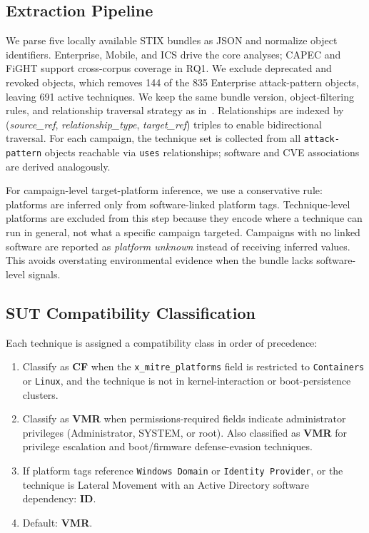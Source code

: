 \documentclass[sigconf,anonymous,review]{acmart}
\newcommand{\stix}{STIX\xspace}
\begin{document}
\subsection{Extraction Pipeline}

We parse five locally available \stix{} bundles as JSON and normalize object identifiers. Enterprise, Mobile, and ICS drive the core analyses; CAPEC and FiGHT support cross-corpus coverage in RQ1. We exclude deprecated and revoked objects, which removes 144 of the 835 Enterprise attack-pattern objects, leaving 691 active techniques. We keep the same bundle version, object-filtering rules, and relationship traversal strategy as in~\cite{ferraz2026proceduralsemanticsgapstructured}. Relationships are indexed by (\textit{source\_ref}, \textit{relationship\_type}, \textit{target\_ref}) triples to enable bidirectional traversal. For each campaign, the technique set is collected from all \texttt{attack-pattern} objects reachable via \texttt{uses} relationships; software and CVE associations are derived analogously.

For campaign-level target-platform inference, we use a conservative rule: platforms are inferred only from software-linked platform tags. Technique-level platforms are excluded from this step because they encode where a technique can run in general, not what a specific campaign targeted. Campaigns with no linked software are reported as \emph{platform unknown} instead of receiving inferred values. This avoids overstating environmental evidence when the bundle lacks software-level signals.

\subsection{SUT Compatibility Classification}

Each technique is assigned a compatibility class in order of precedence:

\begin{enumerate}[leftmargin=1.2em,itemsep=0.2em,topsep=0.2em]
\item Classify as \textbf{CF} when the \texttt{x\_mitre\_platforms} field is restricted to \texttt{Containers} or \texttt{Linux}, and the technique is not in kernel-interaction or boot-persistence clusters.

\item Classify as \textbf{VMR} when permissions-required fields indicate administrator privileges (Administrator, SYSTEM, or root). Also classified as \textbf{VMR} for privilege escalation and boot/firmware defense-evasion techniques.

\item If platform tags reference \texttt{Windows Domain} or \texttt{Identity Provider}, or the technique is Lateral Movement with an Active Directory software dependency: \textbf{ID}.

\item Default: \textbf{VMR}.
\end{enumerate}
\end{document}
